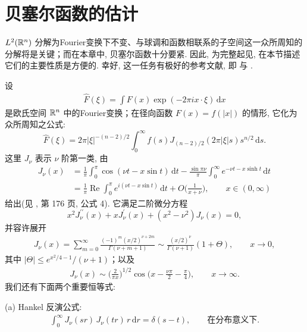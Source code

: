 \section{贝塞尔函数的估计}

$L^2(\mathbb{R}^n)$ 分解为Fourier变换下不变、与球调和函数相联系的子空间这一众所周知的分解将是关键；而在本章中, 贝塞尔函数十分要紧. 因此, 为完整起见, 在本节描述它们的主要性质是方便的. 幸好, 这一任务有极好的参考文献, 即 \cite{b16} 与 \cite{b147}.

设
\begin{align*}
  \widehat{F}(\xi)=\int F(x)\exp(-2\pi i x\cdot\xi)\,\mathrm{d}x
\end{align*}
是欧氏空间 $\mathbb{R}^n$ 中的Fourier变换；在径向函数 $F(x) = f(|x|)$ 的情形, 它化为众所周知之公式:
\begin{equation}\label{eq:6.1}
  \widehat{F}(\xi)=2\pi|\xi|^{-(n-2)/2}\int_{0}^{\infty}f(s)J_{(n-2)/2}(2\pi|\xi|s)s^{n/2}\,\mathrm{d}s.
\end{equation}
这里 $J_{\nu}$ 表示 $\nu$ 阶第一类, 由
\begin{equation}\label{eq:6.2}
  \begin{aligned}
  J_{\nu}(x)
  &=\frac{1}{\pi}\int_{0}^{\pi}\cos(\nu t-x\sin t)\,\mathrm{d}t
   -\frac{\sin\pi\nu}{\pi}\int_{0}^{\infty}e^{-\nu t-x\sinh t}\,\mathrm{d}t\\
  &=\frac{1}{\pi}\operatorname{Re}\int_{0}^{\pi}e^{i(\nu t-x\sin t)}\,\mathrm{d}t
   +O\Big(\frac{1}{x+\nu}\Big),\qquad x\in(0,\infty)
  \end{aligned}
\end{equation}
给出(见 \cite{b147}, 第 176 页, 公式 4). 它满足二阶微分方程
\begin{equation}\label{eq:6.3}
  x^{2}J_{\nu}^{\prime\prime}(x)+x J_{\nu}^{\prime}(x)+\left(x^{2}-\nu^{2}\right)J_{\nu}(x)=0,
\end{equation}
并容许展开
\begin{align*}
  J_{\nu}(x)=\sum_{m=0}^{\infty}\frac{(-1)^{m}(x/2)^{\nu+2m}}{\Gamma(\nu+m+1)}
  \sim\frac{(x/2)^{\nu}}{\Gamma(\nu+1)}(1+\Theta),\qquad x\rightarrow 0,
\end{align*}
其中 $|\Theta| \leq e^{x^2/4-1}/(\nu+1)$；以及
\begin{align*}
  J_{\nu}(x)\sim\Big(\frac{2}{\pi x}\Big)^{1/2}\cos\Big(x-\frac{\nu\pi}{2}-\frac{\pi}{4}\Big),\qquad x\to\infty.
\end{align*}
我们还有下面两个重要恒等式:

(a) Hankel 反演公式:
\begin{align*}
  \int_{0}^{\infty}J_{\nu}(s r)\,J_{\nu}(t r)\,r\,\mathrm{d}r=\delta(s-t),\qquad \text{在分布意义下}.
\end{align*}

